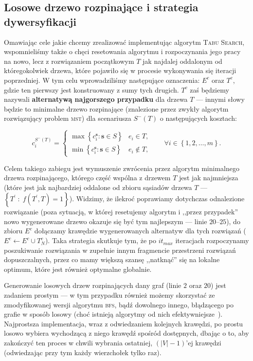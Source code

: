 \subsection{Losowe drzewo rozpinające i strategia dywersyfikacji}

Omawiając cele jakie chcemy zrealizować implementując algorytm \textsc{Tabu Search}, wspomnieliśmy także o chęci resetowania algorytmu i rozpoczynania jego pracy na nowo, lecz z rozwiązaniem początkowym $T$ jak najdalej oddalonym od któregokolwiek drzewa, które pojawiło się w procesie wykonywania się iteracji poprzedniej. W tym celu wprowadziliśmy następujące oznaczenia: $E^{c}$ oraz $T^{c}$, gdzie ten pierwszy jest konstruowany z sumy tych drugich. $T^{c}$ zaś będziemy nazywali \textbf{alternatywą najgorszego przypadku} dla drzewa $T$ --- innymi słowy będzie to minimalne drzewo rozpinające (znalezione przez zwykły algorytm rozwiązujący problem \textsc{mst}) dla scenariusza $S^{-} \left( T \right)$ o następujących kosztach:

\begin{equation}
	c^{S^{-} \left( T \right)}_{i} = \left\{\begin{matrix}
	\max \left\{ c^{\textbf{s}}_{i} : \textbf{s} \in S \right\} & e_{i} \in T\text{,}\\ 
	\min \left\{ c^{\textbf{s}}_{i} : \textbf{s} \in S \right\} & e_{i} \notin T\text{,}
	\end{matrix}\right. \qquad \forall i \in \left\{ 1, 2, \dots, m \right\}\text{.}
\end{equation}

Celem takiego zabiegu jest wymuszenie zwrócenia przez algorytm minimalnego drzewa rozpinającego, którego część wspólna z drzewem $T$ jest jak najmniejsza (które jest jak najbardziej oddalone od zbioru sąsiadów drzewa $T$ --- $\left\{ T^{\prime} \; : \; f \left( T^{\prime}, T \right) = 1 \right\}$). Widzimy, że ilekroć poprawiamy dotychczas odnalezione rozwiązanie (poza sytuacją, w której resetujemy algorytm i ,,przez przypadek'' nowo wygenerowane drzewo okazuje się być tym najlepszym --- linie $20$--$25$), do zbioru $E^{c}$ dołączamy krawędzie wygenerowanych alternatyw dla tych rozwiązań ($E^{c} \leftarrow E^{c} \cup T_{N}^{c}$). Taka strategia skutkuje tym, że po $it_{max}$ iteracjach rozpoczynamy poszukiwanie rozwiązania w zupełnie innym fragmencie przestrzeni rozwiązań dopuszczalnych, przez co mamy większą szansę ,,natknąć'' się na lokalne optimum, które jest również optymalne globalnie.

Generowanie losowych drzew rozpinających dany graf (linie $2$ oraz $20$) jest zadaniem prostym --- w tym przypadku również możemy skorzystać ze zmodyfikowanej wersji algorytmu \textsc{bfs}, bądź dowolnego innego, błądzącego po grafie w sposób losowy (choć istnieją algorytmy od nich efektywniejsze~\cite{Wilson:1996:GRS:237814.237880}). Najprostsza implementacja, wraz z odwiedzaniem kolejnych krawędzi, po prostu losowo wybiera wychodzącą z niego krawędź spośród dostępnych, dbając o to, aby zakończyć ten proces w chwili wybrania ostatniej, $\left( \left| V \right| - 1\right)$'ej krawędzi (odwiedzając przy tym każdy wierzchołek tylko raz).

